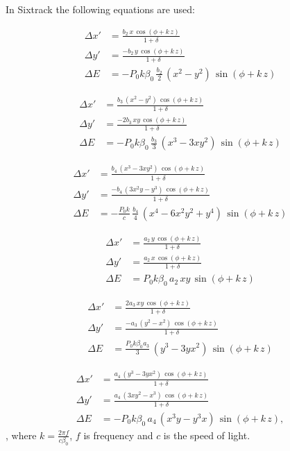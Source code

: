 \documentclass[english]{article}
\begin{document}
In Sixtrack the following equations are used:

\begin{align}\Delta x' & =\frac{b_{2}\, x\,\cos\left(\phi+k\, z\right)}{1+\delta}\\
\Delta y' & =\frac{-b_{2}\, y\,\cos\left(\phi+k\, z\right)} {1+\delta} \\
\Delta E & =-P_0 k\beta_0\,\frac{b_{2}}{2}\,\left(x^{2}-y^{2}\right)\,\sin\left(\phi+k\, z\right)
\end{align}

 \begin{align}\Delta x' & =\frac{b_{3}\,\left(x^{2}-y^{2}\right)\,\cos\left(\phi+k\, z\right)}{1 + \delta}\\
\Delta y' & =\frac{-2b_{3}\, xy\,\cos\left(\phi+k\, z\right)}{1 + \delta}\\
\Delta E & =-P_0 k\beta_0\,\frac{b_{3}}{3}\,\left(x^{3}-3xy^{2}\right)\,\sin\left(\phi+k\, z\right)
\end{align}

 \begin{align}\Delta x' & =\frac{b_{4}\,\left(x^{3}-3xy^{2}\right)\,\cos\left(\phi+k\, z\right)}{1 + \delta}\\
\Delta y' & =\frac{-b_{4}\,\left(3x^{2}y-y^{3}\right)\,\cos\left(\phi+k\, z\right)}{1 + \delta}\\
\Delta E & =-\frac{P_0 k}{c}\,\frac{b_{4}}{4}\,\left(x^{4}-6x^{2}y^{2}+y^{4}\right)\,\sin\left(\phi+k\, z\right)
\end{align}

 \begin{align}\Delta x' & =\frac{a_{2}\, y\,\cos\left(\phi+k\, z\right)}{1 + \delta}\\
\Delta y' & =\frac{a_{2}\, x\,\cos\left(\phi+k\, z\right)}{1 + \delta}\\
\Delta E & =P_0 k\beta_0\, a_{2}\, xy\,\sin\left(\phi+k\, z\right)
\end{align}

 \begin{align}\Delta x' & =\frac{2a_{3}\, xy\,\cos\left(\phi+k\, z\right)}{1 + \delta}\\
\Delta y' & =\frac{-a_{3}\,\left(y^{2}-x^{2}\right)\,\cos\left(\phi+k\, z\right)}{1 + \delta}\\
\Delta E & =\frac{P_0 k\beta_0a_{3}}{3}\,\left(y^{3}-3yx^{2}\right)\,\sin\left(\phi+k\, z\right)
\end{align}

 \begin{align}\Delta x' & =\frac{a_{4}\,\left(y^{3}-3yx^{2}\right)\,\cos\left(\phi+k\, z\right)}{1 + \delta}\\
\Delta y' & =\frac{a_{4}\,\left(3xy^{2}-x^{3}\right)\,\cos\left(\phi+k\, z\right)}{1 + \delta}\\
\Delta E & =-P_0 k\beta_0\, a_{4}\,\left(x^{3}y-y^{3}x\right)\,\sin\left(\phi+k\, z\right),
\end{align}
, where $k = \frac{2\pi f}{c\beta_0} $, $f$ is frequency and $c$ is the speed of light. 
\end{document}
